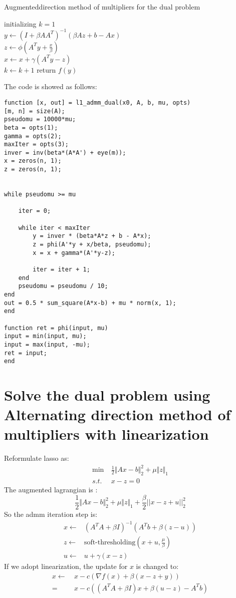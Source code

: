 \documentclass[11pt, oneside]{article}   	%
\begin{document}
\begin{algorithm}[H]
  \SetAlgoNoLine
  \caption{Augmenteddirection method of multipliers for the dual problem} 
  initializing $k = 1$\\
  {  
  $y\gets  (I + \beta AA^T)^{-1}(\beta Az+b-Ax)$\\
  
  $z \gets  \phi(A^Ty+\frac{x}{\beta})$\\
  $ x\gets x + \gamma (A^Ty-z)$\\
   $k\gets k+1$
  }
  return $f(y)$
\end{algorithm}

The code is showed as follows:
\lstset{
 frame=single, 
breaklines=true,
language=MATLAB,
 }
\begin{lstlisting}
function [x, out] = l1_admm_dual(x0, A, b, mu, opts)
[m, n] = size(A);
pseudomu = 10000*mu;
beta = opts(1);
gamma = opts(2);
maxIter = opts(3);
inver = inv(beta*(A*A') + eye(m));
x = zeros(n, 1);
z = zeros(n, 1);


while pseudomu >= mu
     
    iter = 0;
    
    while iter < maxIter                
        y = inver * (beta*A*z + b - A*x);
        z = phi(A'*y + x/beta, pseudomu);
        x = x + gamma*(A'*y-z); 

        iter = iter + 1;
    end
    pseudomu = pseudomu / 10;
end
out = 0.5 * sum_square(A*x-b) + mu * norm(x, 1);
end

function ret = phi(input, mu)
input = min(input, mu);
input = max(input, -mu);
ret = input;
end
\end{lstlisting}

\section{Solve the dual problem using Alternating direction method of multipliers with linearization}
Reformulate lasso as:
\begin{align}
\min &\ \frac{1}{2}\Vert Ax-b\Vert^2_2+\mu\Vert z\Vert_1 \\
s.t. & \ x - z =0
\end{align}
The augmented lagrangian is :
\begin{equation}
\frac{1}{2}\Vert Ax-b\Vert^2_2+\mu\Vert z\Vert_1  + \frac{\beta}{2}||x-z+u||^2_2 
\end{equation}
So the admm iteration step is:
\begin{align}
x \gets & (A^TA+\beta I)^{-1}(A^Tb+\beta(z - u))\\
z \gets & \textrm{soft-thresholding}(x+u, \frac{\mu}{\beta})\\
u \gets & u + \gamma(x -z )
\end{align}
If we adopt linearization, the update for $x$ is changed to:
\begin{align}
x \gets &  \  { x } - c \left( \nabla f \left( { x }  \right) + \beta   \left(  x-z+y\right) \right)\\
 = &\ x - c\left((A^TA+\beta I)x+\beta(u-z)-A^Tb\right)
\end{align}
\end{document}
